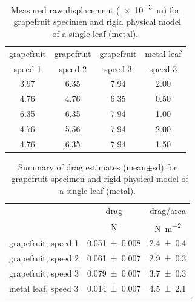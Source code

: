 \begin{table}
\caption{Measured raw displacement (\SI{e-3}{\meter}) for \Cxparadisi\ grapefruit specimen and rigid physical model of a single leaf (metal).}
\label{tab:results:displacement}
\begin{center}
\begin{tabular}{cccc}
\toprule
grapefruit & grapefruit & grapefruit & metal leaf \\
speed 1 & speed 2 & speed 3 & speed 3 \\ 
\midrule
3.97 & 6.35 & 7.94 & 2.00 \\ %
4.76 & 4.76 & 6.35 & 0.50 \\
6.35 & 6.35 & 7.94 & 1.00 \\
4.76 & 5.56 & 7.94 & 2.00 \\
4.76 & 6.35 & 7.94 & 1.50 \\
\bottomrule
\end{tabular}
\end{center}
\end{table}

\begin{table}
\caption{Summary of drag estimates (mean$\pm$sd) for \Cxparadisi\ grapefruit specimen and rigid physical model of a single leaf (metal).}
\label{tab:results:drag}
\begin{center}
\begin{tabular}{lcc} %
\toprule
& drag & drag/area \\
& \si{\newton} & \si{\newton\per\meter\squared} \\
\midrule
grapefruit, speed 1 & \num{0.051\pm0.008} & \num{2.4\pm0.4} \\
grapefruit, speed 2 & \num{0.061\pm0.007} & \num{2.9\pm0.3} \\
grapefruit, speed 3 & \num{0.079\pm0.007} & \num{3.7\pm0.3} \\
metal leaf, speed 3 & \num{0.014\pm0.007} & \num{4.5\pm2.1} \\
\bottomrule
\end{tabular}
\end{center}
\end{table}

